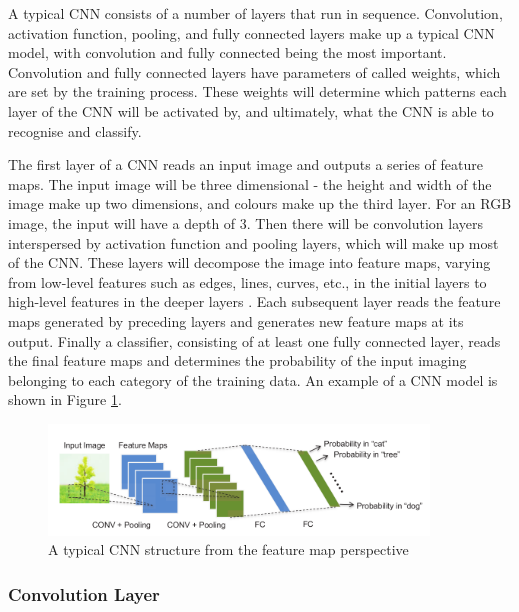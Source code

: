\documentclass[12pt]{article}
\begin{document}
A typical CNN consists of a number of layers that run in sequence. Convolution, activation function, pooling, and fully connected layers make up a typical CNN model, with convolution and fully connected being the most important. Convolution and fully connected layers have parameters of called weights, which are set by the training process. These weights will determine which patterns each layer of the CNN will be activated by, and ultimately, what the CNN is able to recognise and classify. 

The first layer of a CNN reads an input image and outputs a series of feature maps. The input image will be three dimensional - the height and width of the image make up two dimensions, and colours make up the third layer. For an RGB image, the input will have a depth of 3. Then there will be convolution layers interspersed by activation function and pooling layers, which will make up most of the CNN. These layers will decompose the image into feature maps, varying from low-level features such as edges, lines, curves, etc., in the initial layers to high-level features in the deeper layers \cite{SudaFpgaAccelerator}. Each subsequent layer reads the feature maps generated by preceding layers and generates new feature maps at its output. Finally a classifier, consisting of at least one fully connected layer, reads the final feature maps and determines the probability of the input imaging belonging to each category of the training data. An example of a CNN model is shown in Figure \ref{fig:typicalCNN}.

\begin{figure} [H]
\centering
\includegraphics[width=0.9\textwidth]{figures/typicalCnn}
\caption{A typical CNN structure from the feature map perspective \cite{embeddedFpgaCnn} \label{fig:typicalCNN}}
\end{figure}

\subsubsection{Convolution Layer}
\label{sec:Background-CNN-Conv}
\end{document}
